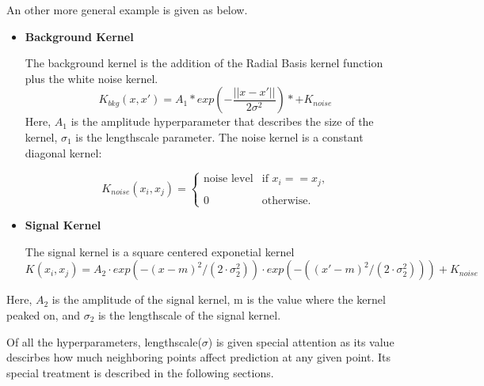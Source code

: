 An other more general example is given as below.
%
    \begin{itemize}
        \item \textbf{Background Kernel}

            The background kernel is the addition of the Radial Basis kernel function plus the white noise kernel.
            \begin{equation}
                K_{bkg}(x, x') = A_{1} * exp(-\frac{||x-x'||}{2\sigma^{2}}) *+ K_{noise}
                \label{eq:backgroundkernel}
            \end{equation}
            Here, $A_{1}$ is the amplitude hyperparameter that describes the size of the kernel, $\sigma_{1}$ is the lengthscale parameter.
            The noise kernel is a constant diagonal kernel:
            

			\begin{equation}
            K_{noise}(x_{i}, x_{j}) =
			\begin{cases} \text{noise level} & \text{if $x_{i}==x_{j}$,} \\
			\\
            0 & \text{otherwise.}
			\end{cases}
			\end{equation}

        \item \textbf{Signal Kernel}

            The signal kernel is a square centered exponetial kernel
            \begin{equation}
            K(x_{i}, x_{j})=A_{2}\cdot exp(-(x-m)^{2}/(2\cdot\sigma_{2}^{2}))\cdot exp(-((x'-m)^{2}/(2\cdot\sigma_{2}^{2}))) + K_{noise}
            \label{eq:signalkernel}
            \end{equation}

    \end{itemize}
            Here, $A_{2}$ is the amplitude of the signal kernel, m is the value where the kernel peaked on, and $\sigma_{2}$ is the lengthscale of the signal kernel. 

	Of all the hyperparameters, lengthscale($\sigma$) is given special attention as its value descirbes how much neighboring points affect prediction at any given point. Its special treatment is described in the following sections.

